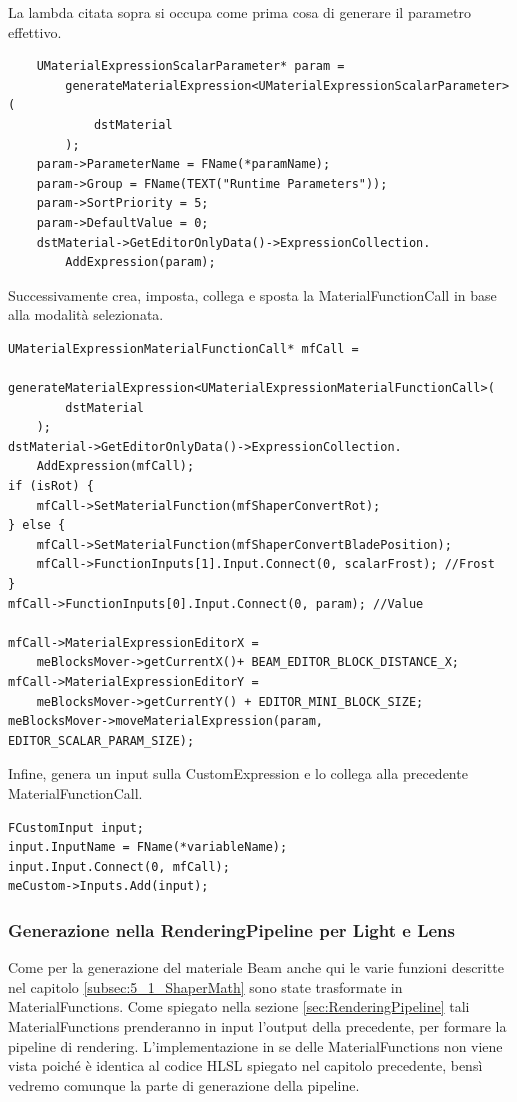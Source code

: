 \documentclass[main.tex]{subfiles}
\begin{document}
La lambda citata sopra si occupa come prima cosa di generare il parametro effettivo.
\begin{lstlisting}
    UMaterialExpressionScalarParameter* param =
        generateMaterialExpression<UMaterialExpressionScalarParameter>(
            dstMaterial
        );
    param->ParameterName = FName(*paramName);
    param->Group = FName(TEXT("Runtime Parameters"));
    param->SortPriority = 5;
    param->DefaultValue = 0;
    dstMaterial->GetEditorOnlyData()->ExpressionCollection.
        AddExpression(param);
\end{lstlisting}
Successivamente crea, imposta, collega e sposta la MaterialFunctionCall in base alla modalità selezionata.
\begin{lstlisting}
UMaterialExpressionMaterialFunctionCall* mfCall = 
    generateMaterialExpression<UMaterialExpressionMaterialFunctionCall>(
        dstMaterial
    );
dstMaterial->GetEditorOnlyData()->ExpressionCollection.
    AddExpression(mfCall);
if (isRot) {
    mfCall->SetMaterialFunction(mfShaperConvertRot);
} else {
    mfCall->SetMaterialFunction(mfShaperConvertBladePosition);
    mfCall->FunctionInputs[1].Input.Connect(0, scalarFrost); //Frost
}
mfCall->FunctionInputs[0].Input.Connect(0, param); //Value

mfCall->MaterialExpressionEditorX =
    meBlocksMover->getCurrentX()+ BEAM_EDITOR_BLOCK_DISTANCE_X;
mfCall->MaterialExpressionEditorY =
    meBlocksMover->getCurrentY() + EDITOR_MINI_BLOCK_SIZE;
meBlocksMover->moveMaterialExpression(param, EDITOR_SCALAR_PARAM_SIZE);
\end{lstlisting}
Infine, genera un input sulla CustomExpression e lo collega alla precedente MaterialFunctionCall.
\begin{lstlisting}
FCustomInput input;
input.InputName = FName(*variableName);
input.Input.Connect(0, mfCall);
meCustom->Inputs.Add(input);
\end{lstlisting}

\subsubsection{Generazione nella RenderingPipeline per Light e Lens}\label{subsec:5_1_ShaperRenderingPipeline}
Come per la generazione del materiale Beam anche qui le varie funzioni descritte nel capitolo \ref{subsec:5_1_ShaperMath} sono state trasformate in MaterialFunctions. Come spiegato nella sezione \ref{sec:RenderingPipeline} tali MaterialFunctions prenderanno in input l'output della precedente, per formare la pipeline di rendering. L'implementazione in se delle MaterialFunctions non viene vista poiché è identica al codice HLSL spiegato nel capitolo precedente, bensì vedremo comunque la parte di generazione della pipeline. \newline
\end{document}
